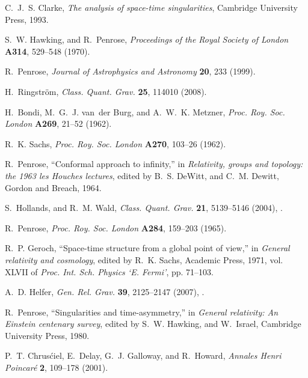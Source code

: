 \documentclass[12pt]{article}
\begin{document}
\begin{thebibliography}{57}
C.~J.~S. Clarke, \emph{The analysis of space-time singularities}, Cambridge
  University Press, 1993.

S.~W. Hawking, and R.~Penrose, \emph{Proceedings of the Royal Society of
  London} \textbf{A314}, 529--548 (1970).

R.~Penrose, \emph{Journal of Astrophysics and Astronomy} \textbf{20}, 233
  (1999).

H.~Ringstr\"om, \emph{Class. Quant. Grav.} \textbf{25}, 114010 (2008).

H.~Bondi, M.~G.~J. van~der Burg, and A.~W.~K. Metzner, \emph{Proc. Roy. Soc.
  London} \textbf{A269}, 21--52 (1962).

R.~K. Sachs, \emph{Proc. Roy. Soc. London} \textbf{A270}, 103--26 (1962).

R.~Penrose, \enquote{Conformal approach to infinity,} in \emph{Relativity,
  groups and topology: the 1963 les Houches lectures}, edited by B.~S. DeWitt,
  and C.~M. Dewitt, Gordon and Breach, 1964.

S.~Hollands, and R.~M. Wald, \emph{Class. Quant. Grav.} \textbf{21}, 5139--5146
  (2004), .

R.~Penrose, \emph{Proc. Roy. Soc. London} \textbf{A284}, 159--203 (1965).

R.~P. Geroch, \enquote{Space-time structure from a global point of view,} in
  \emph{General relativity and cosmology}, edited by R.~K. Sachs, Academic
  Press, 1971, vol. XLVII of \emph{Proc. Int. Sch. Physics `E. Fermi'}, pp.
  71--103.

A.~D. Helfer, \emph{Gen. Rel. Grav.} \textbf{39}, 2125--2147 (2007),
  .

R.~Penrose, \enquote{Singularities and time-asymmetry,} in \emph{General
  relativity: An Einstein centenary survey}, edited by S.~W. Hawking, and
  W.~Israel, Cambridge University Press, 1980.

P.~T. Chrus\'ciel, E.~Delay, G.~J. Galloway, and R.~Howard, \emph{Annales Henri
  Poincar\'e} \textbf{2}, 109--178 (2001).


\end{thebibliography}
\end{document}
